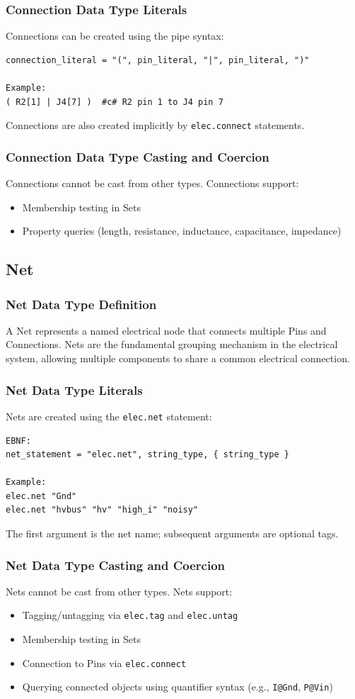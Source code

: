 \subsubsection{Connection Data Type Literals}
Connections can be created using the pipe syntax:
\begin{verbatim}
connection_literal = "(", pin_literal, "|", pin_literal, ")"

Example:
( R2[1] | J4[7] )  #c# R2 pin 1 to J4 pin 7
\end{verbatim}
Connections are also created implicitly by \texttt{elec.connect} statements.
\subsubsection{Connection Data Type Casting and Coercion}
Connections cannot be cast from other types. Connections support:
\begin{itemize}
\item Membership testing in Sets
\item Property queries (length, resistance, inductance, capacitance, impedance)
\end{itemize}
\subsection{Net}
\subsubsection{Net Data Type Definition}
A Net represents a named electrical node that connects multiple Pins and Connections. Nets are the fundamental grouping mechanism in the electrical system, allowing multiple components to share a common electrical connection.
\subsubsection{Net Data Type Literals}
Nets are created using the \texttt{elec.net} statement:
\begin{verbatim}
EBNF:
net_statement = "elec.net", string_type, { string_type }

Example:
elec.net "Gnd"
elec.net "hvbus" "hv" "high_i" "noisy"
\end{verbatim}
The first argument is the net name; subsequent arguments are optional tags.
\subsubsection{Net Data Type Casting and Coercion}
Nets cannot be cast from other types. Nets support:
\begin{itemize}
\item Tagging/untagging via \texttt{elec.tag} and \texttt{elec.untag}
\item Membership testing in Sets
\item Connection to Pins via \texttt{elec.connect}
\item Querying connected objects using quantifier syntax (e.g., \texttt{I@Gnd}, \texttt{P@Vin})
\end{itemize}



